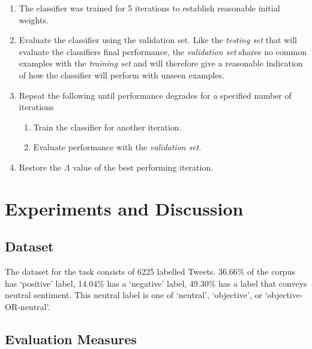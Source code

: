 \documentclass[final,3p,12pt]{elsarticle}
\begin{document}
\begin{enumerate}

    \item The classifier was trained for 5 iterations to establish reasonable
        initial weights.

    \item Evaluate the classifier using the validation set. Like the
        \textit{testing set} that will evaluate the classifiers final
        performance, the \textit{validation set} shares no common examples with
        the \textit{training set} and will therefore give a reasonable
        indication of how the classifier will perform with unseen examples.

    \item Repeat the following until performance degrades for a specified
        number of iterations

    \begin{enumerate}

        \item Train the classifier for another iteration.

        \item Evaluate performance with the \textit{validation set}.

    \end{enumerate}

    \item Restore the $\Lambda$ value of the best performing iteration.

\end{enumerate}

\section{Experiments and Discussion}

\subsection{Dataset}

The dataset for the task consists of 6225 labelled Tweets. 36.66\% of the
corpus has `positive' label, 14.04\% has a `negative' label, 49.30\% has a
label that conveys neutral sentiment. This neutral label is one of `neutral',
`objective', or `objective-OR-neutral'.

\subsection{Evaluation Measures}
\end{document}
